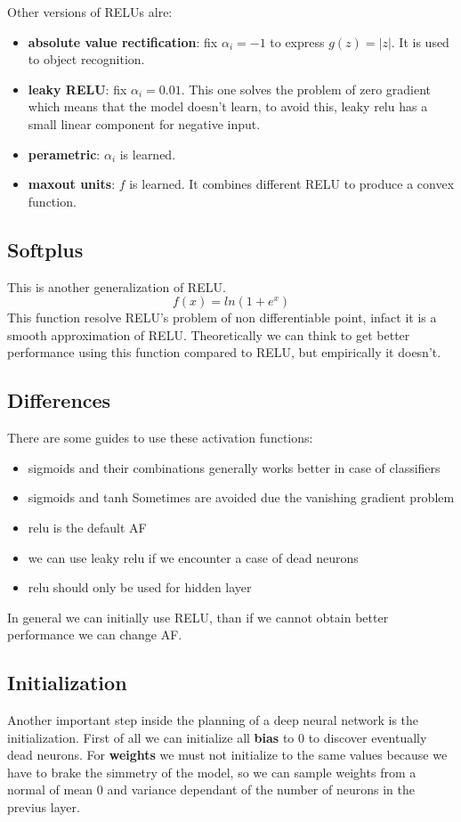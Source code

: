 Other versions of RELUs alre:
\begin{itemize}
    \item \textbf{absolute value rectification}: fix $\alpha_i = -1$ to express $g(z) = |z|$.
    It is used to object recognition.
    \item \textbf{leaky RELU}: fix $\alpha_i = 0.01$. This one solves the problem of
    zero gradient which means that the model doesn't learn, to avoid this, leaky relu 
    has a small linear component for negative input.
    \item \textbf{perametric}: $\alpha_i$ is learned.
    \item \textbf{maxout units}: $f$ is learned. It combines different RELU to produce 
    a convex function.
\end{itemize}

\subsection{Softplus}
This is another generalization of RELU.
$$f(x) = ln(1+e^x)$$
This function resolve RELU's problem of non differentiable point, infact it is 
a smooth approximation of RELU. Theoretically we can think to get better performance 
using this function compared to RELU, but empirically it doesn't.

\subsection{Differences}
There are some guides to use these activation functions:
\begin{itemize}
    \item sigmoids and their combinations generally works better in case of classifiers
    \item sigmoids and tanh Sometimes are avoided due the vanishing gradient problem 
    \item relu is the default AF
    \item we can use leaky relu if we encounter a case of dead neurons
    \item relu should only be used for hidden layer
\end{itemize}
In general we can initially use RELU, than if we cannot obtain better performance 
we can change AF.

\subsection{Initialization}
Another important step inside the planning of a deep neural network is the initialization.
First of all we can initialize all \textbf{bias} to $0$ to discover eventually dead neurons.
For \textbf{weights} we must not initialize to the same values because we have to 
brake the simmetry of the model, so we can sample weights from a normal of mean 
$0$ and variance dependant of the number of neurons in the previus layer.
